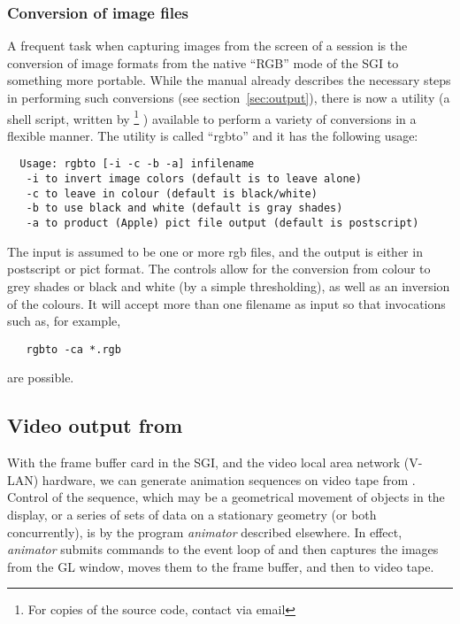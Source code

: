 \subsubsection{Conversion of image files}
\label{sec:image-conversion} 

A frequent task when capturing images from the screen of a \map{} session
is the conversion of image formats from the native ``RGB'' mode of the SGI
to something more portable.  While the manual already describes the
necessary steps in performing such conversions (see
section~\ref{sec:output}), there is now a utility (a shell script, written
by \rob{}\footnote{For copies of the source code, contact \rob{} via email}
) available to perform a variety of conversions in a flexible manner.  The
utility is called ``rgbto'' and it has the following usage:

\begin{verbatim}
  Usage: rgbto [-i -c -b -a] infilename 
   -i to invert image colors (default is to leave alone) 
   -c to leave in colour (default is black/white) 
   -b to use black and white (default is gray shades) 
   -a to product (Apple) pict file output (default is postscript)
\end{verbatim}

The input is assumed to be one or more rgb files, and the output is either
in postscript or pict format.  The controls allow for the conversion from
colour to grey shades or black and white (by a simple thresholding), as
well as an inversion of the colours.  It will accept more than one filename
as input so that invocations such as, for example,\\
%
\begin{verbatim}
   rgbto -ca *.rgb
\end{verbatim}
%
are possible.


\subsection{Video output from \map}
\label{sec:video} 

With the frame buffer card in the SGI, and the video
local area network (V-LAN) hardware, we can generate animation
sequences on video tape from \map.  Control of the sequence, which may be a
geometrical movement of objects in the display, or a series of sets of data
on a stationary geometry (or both concurrently), is by the
program {\em animator\/} described elsewhere.  In effect, {\em animator\/}
submits commands to the event loop of \map{} and then captures the images
from the GL window, moves them to the frame buffer, and then to video tape.

